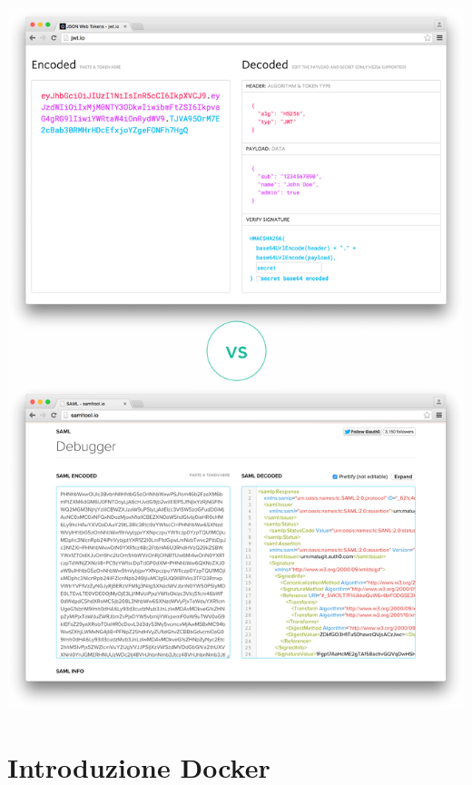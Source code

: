 \documentclass[twoside]{report}
\begin{document}
\begin{center}
\begin{minipage}{0.9\linewidth}
    \vspace{2mm}
    \centering
    \includegraphics[width= \linewidth]{3.png}
    \vspace{2mm}
\end{minipage}

\end{center}

\section{Introduzione Docker}

\graphicspath{ {../progetto/images/docker/} }
\end{document}
